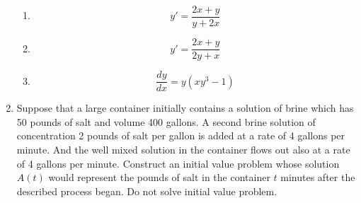 \documentclass[exam=1]{math252exam}
\begin{document}
\begin{enumerate}[label=\arabic*.]
	\begin{enumerate}[label=(\roman*)]
	    \item \[ y' = \frac{2x + y}{y + 2x} \]
	    \item \[ y' = \frac{2x + y}{2y + x} \]
		\item \[ \frac{dy}{dx} = y(xy^{3} - 1) \]
	\end{enumerate}
	\item Suppose that a large container initially contains a solution of brine which has 50 pounds of salt and volume 400 gallons. A second brine solution of concentration 2 pounds of salt per gallon is added at a rate of 4 gallons per minute. And the well mixed solution in the container flows out also at a rate of 4 gallons per minute. Construct an initial value problem whose solution $A(t)$ would represent the pounds of salt in the container $t$ minutes after the described process began. Do not solve initial value problem.
\end{enumerate}
\end{document}
